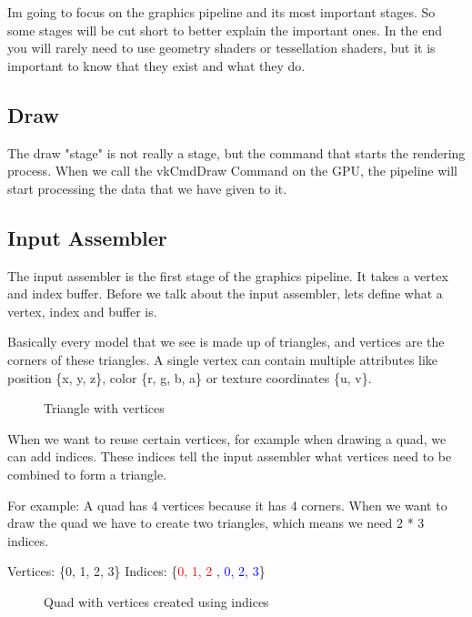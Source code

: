 \documentclass[12pt]{report} \usepackage {preamble}
\begin{document}
Im going to focus on the graphics pipeline and its most important stages.
So some stages will be cut short to better explain the important ones.
In the end you will rarely need to use geometry shaders or tessellation
shaders, but it is important to know that they exist and what they do.

\subsection {Draw}

The draw "stage" is not really a stage, but the command that starts
the rendering process. When we call the vkCmdDraw Command on the GPU,
the pipeline will start processing the data that we have given to
it. \cite{vulkan-spec-draw}

\subsection {Input Assembler}

The input assembler is the first stage of the graphics pipeline. It takes
a vertex and index buffer. \cite{vulkan-spec-pipelines} Before we talk
about the input assembler, lets define what a vertex, index and buffer is.

Basically every model that we see is made up of triangles, and vertices
are the corners of these triangles. A single vertex can contain multiple
attributes like position \{x, y, z\}, color \{r, g, b, a\} or texture
coordinates \{u, v\}. \cite{vulkan-vertex-input}

\begin{figure}[hbtp]
	\centering 
	\caption{Triangle with vertices}
\end{figure} \FloatBarrier

When we want to reuse certain vertices, for example when
drawing a quad, we can add indices.  These indices tell the
input assembler what vertices need to be combined to form a
triangle. \cite{vulkan-tutorial-index-buffer}

For example: A quad has 4 vertices because it has 4 corners. When we want
to draw the quad we have to create two triangles, which means we need 2 *
3 indices.

Vertices: \{0, 1, 2, 3\} Indices: \{\textcolor{red}{0, 1, 2} ,
\textcolor{blue}{0, 2, 3}\}

\begin{figure}[hbtp]
	\centering 
	\caption{Quad
		with vertices created using indices}
\end{figure} \FloatBarrier
\end{document}
